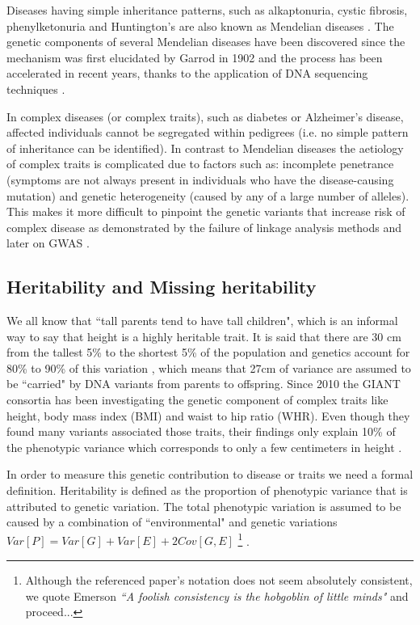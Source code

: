 Diseases having simple inheritance patterns, such as alkaptonuria, cystic fibrosis, phenylketonuria and Huntington's are also known as Mendelian diseases \cite{kennedy2001}. 
The genetic components of several Mendelian diseases have been discovered since the mechanism was first elucidated by Garrod in 1902 and the process has been accelerated in recent years, thanks to the application of DNA sequencing techniques \cite{bamshad2011exome}.

In complex diseases (or complex traits), such as diabetes or Alzheimer's disease, affected individuals cannot be segregated within pedigrees (i.e. no simple pattern of inheritance can be identified). 
In contrast to Mendelian diseases the aetiology of complex traits is complicated due to factors such as: incomplete penetrance (symptoms are not always present in individuals who have the disease-causing mutation) and genetic heterogeneity (caused by any of a large number of alleles). 
This makes it more difficult to pinpoint the genetic variants that increase risk of complex disease as demonstrated by the failure of linkage analysis methods and later on GWAS \cite{botstein2003discovering}.

\subsection{Heritability and Missing heritability}

We all know that ``tall parents tend to have tall children", which is an informal way to say that height is a highly heritable trait. 
It is said that there are 30 cm from the tallest 5\% to the shortest 5\% of the population and genetics account for 80\% to 90\% of this variation \cite{wood2014defining}, which means that 27cm of variance are assumed to be ``carried" by DNA variants from parents to offspring. 
Since 2010 the GIANT consortia has been investigating the genetic component of complex traits like height, body mass index (BMI) and waist to hip ratio (WHR). Even though they found many variants associated those traits, their findings only explain 10\% of the phenotypic variance which corresponds to only a few centimeters in height \cite{wood2014defining}.

In order to measure this genetic contribution to disease or traits we need a formal definition. 
Heritability is defined as the proportion of phenotypic variance that is attributed to genetic variation. 
The total phenotypic variation is assumed to be caused by a combination of ``environmental" and genetic variations $Var[P] = Var[G] + Var[E] + 2 Cov[G, E]$ \cite{zuk2012mystery}
\iffinal
\footnote{Although the referenced paper's notation does not seem absolutely consistent, we quote Emerson \textit{``A foolish consistency is the hobgoblin of little minds"} and proceed...}
\fi
.

